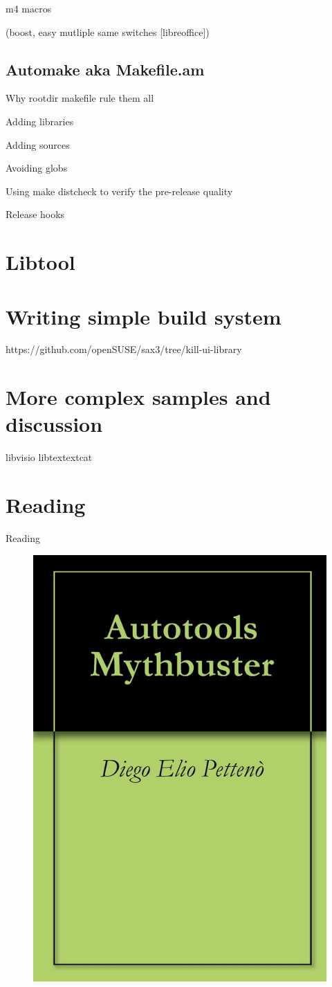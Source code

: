 \documentclass{beamer}
\begin{document}
\begin{frame}[t]{m4 macros}
	\begin{small}
	
	\end{small}
\end{frame}



(boost, easy mutliple same switches [libreoffice])

\subsection{Automake aka Makefile.am}

Why rootdir makefile rule them all

Adding libraries

Adding sources

Avoiding globs

Using make distcheck to verify the pre-release quality

Release hooks

\section{Libtool}

\section{Writing simple build system}
https://github.com/openSUSE/sax3/tree/kill-ui-library

\section{More complex samples and discussion}
libvisio
libtextextcat

\section{Reading}

\begin{frame}{Reading}
	\begin{figure}
	\includegraphics[width= 0.4\linewidth]{mythbuster.png}
	\end{figure}
\end{frame}
\end{document}
